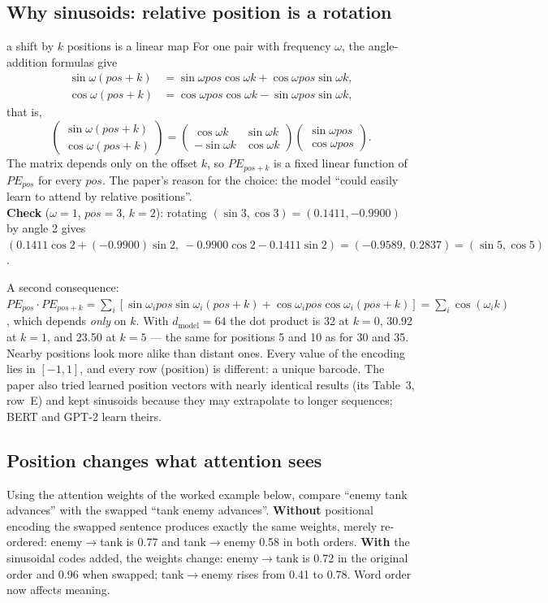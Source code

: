 \documentclass[11pt]{article}
\begin{document}
\subsection{Why sinusoids: relative position is a rotation}
\begin{derivation}{a shift by $k$ positions is a linear map}
For one pair with frequency $\omega$, the angle-addition formulas give
\begin{align*}\sin\omega(pos+k)&=\sin\omega pos\cos\omega k+\cos\omega pos\sin\omega k,\\ \cos\omega(pos+k)&=\cos\omega pos\cos\omega k-\sin\omega pos\sin\omega k,\end{align*}
that is,
\[\begin{pmatrix}\sin\omega(pos{+}k)\\\cos\omega(pos{+}k)\end{pmatrix}=\begin{pmatrix}\cos\omega k&\sin\omega k\\-\sin\omega k&\cos\omega k\end{pmatrix}\begin{pmatrix}\sin\omega pos\\\cos\omega pos\end{pmatrix}.\]
The matrix depends only on the offset $k$, so $PE_{pos+k}$ is a fixed linear function of $PE_{pos}$ for every $pos$. The paper's reason for the choice: the model ``could easily learn to attend by relative positions''.\\
\textbf{Check} ($\omega=1$, $pos=3$, $k=2$): rotating $(\sin3,\cos3)=(0.1411,-0.9900)$ by angle 2 gives $(0.1411\cos2+(-0.9900)\sin2,\ -0.9900\cos2-0.1411\sin2)=(-0.9589,\ 0.2837)=(\sin5,\cos5)$.
\end{derivation}
A second consequence: $PE_{pos}\cdot PE_{pos+k}=\sum_i[\sin\omega_ipos\sin\omega_i(pos{+}k)+\cos\omega_ipos\cos\omega_i(pos{+}k)]=\sum_i\cos(\omega_ik)$, which depends \emph{only} on $k$. With $d_{\text{model}}=64$ the dot product is 32 at $k=0$, 30.92 at $k=1$, and 23.50 at $k=5$ --- the same for positions 5 and 10 as for 30 and 35. Nearby positions look more alike than distant ones. Every value of the encoding lies in $[-1,1]$, and every row (position) is different: a unique barcode. The paper also tried learned position vectors with nearly identical results (its Table~3, row~E) and kept sinusoids because they may extrapolate to longer sequences; BERT and GPT-2 learn theirs.

\subsection{Position changes what attention sees}
Using the attention weights of the worked example below, compare ``enemy tank advances'' with the swapped ``tank enemy advances''. \textbf{Without} positional encoding the swapped sentence produces exactly the same weights, merely re-ordered: enemy$\to$tank is 0.77 and tank$\to$enemy 0.58 in both orders. \textbf{With} the sinusoidal codes added, the weights change: enemy$\to$tank is 0.72 in the original order and 0.96 when swapped; tank$\to$enemy rises from 0.41 to 0.78. Word order now affects meaning.
\end{document}
